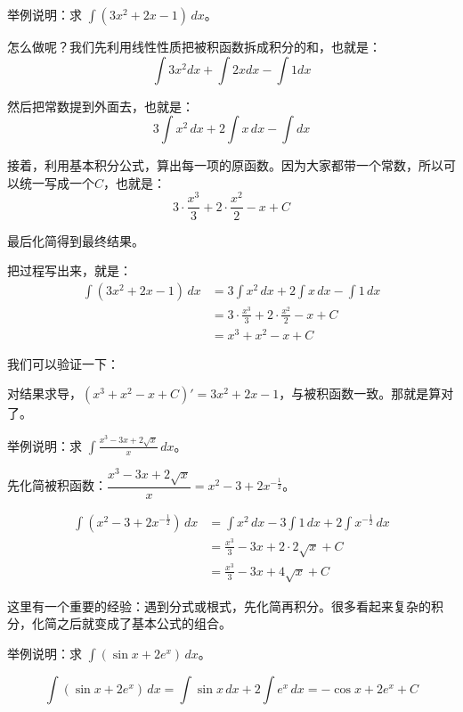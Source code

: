 \begin{myexample}
  举例说明：求 $ \int (3x^2 + 2x - 1)\, dx$。

  怎么做呢？我们先利用线性性质把被积函数拆成积分的和，也就是：
  $$\int 3x^2 dx + \int 2x dx - \int 1dx$$

  然后把常数提到外面去，也就是：
  $$3\int x^2\, dx + 2\int x\, dx - \int dx$$

  接着，利用基本积分公式，算出每一项的原函数。因为大家都带一个常数，所以可以统一写成一个$C$，也就是：
  $$3 \cdot \frac{x^3}{3} + 2 \cdot \frac{x^2}{2} - x + C$$

  最后化简得到最终结果。

  把过程写出来，就是：
  \[
  \begin{aligned}
  \int (3x^2 + 2x - 1)\, dx
  &= 3\int x^2\, dx + 2\int x\, dx - \int 1\, dx \\
  &= 3 \cdot \frac{x^3}{3} + 2 \cdot \frac{x^2}{2} - x + C \\
  &= x^3 + x^2 - x + C
  \end{aligned}
  \]

\end{myexample}

  我们可以验证一下：

  对结果求导，$(x^3+x^2-x+C)' = 3x^2+2x-1$，与被积函数一致。那就是算对了。

\begin{myexample}
  举例说明：求 $ \int \frac{x^3 - 3x + 2\sqrt{x}}{x}\, dx$。

  先化简被积函数：$\dfrac{x^3 - 3x + 2\sqrt{x}}{x} = x^2 - 3 + 2x^{-\frac{1}{2}}$。

  \[
  \begin{aligned}
  \int (x^2 - 3 + 2x^{-\frac{1}{2}})\, dx
  &= \int x^2\, dx - 3\int 1\, dx + 2\int x^{-\frac{1}{2}}\, dx \\
  &= \frac{x^3}{3} - 3x + 2 \cdot 2\sqrt{x} + C \\
  &= \frac{x^3}{3} - 3x + 4\sqrt{x} + C
  \end{aligned}
  \]
\end{myexample}

这里有一个重要的经验：遇到分式或根式，先化简再积分。很多看起来复杂的积分，化简之后就变成了基本公式的组合。

\begin{myexample}
  举例说明：求 $ \int (\sin x + 2e^x)\, dx$。

  \[
  \int (\sin x + 2e^x)\, dx = \int \sin x\, dx + 2\int e^x\, dx = -\cos x + 2e^x + C
  \]
\end{myexample}

